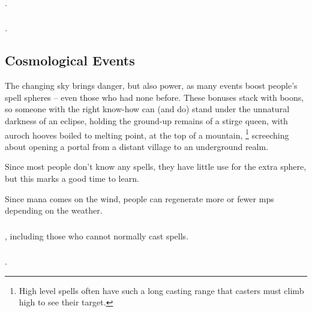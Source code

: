 \begin{multicols}{2}
\subsubsection{}
.

\subsubsection{}
.

\setcounter{track}{\month}
\setcounter{age}{1}
\boxPair[t]{
  \parallelCalendar
}{
  \orrery[1/1, 1/16, 2/1, 3/1, 2/16, 12/16]
}

\setCycle{\month}{\day}

\subsection{Cosmological Events}
\label{weather}

The changing sky brings danger, but also power, as many events boost people's spell \glspl{sphere} -- even those who had none before.
These bonuses stack with \glspl{boon}, so someone with the right know-how can (and do) stand under the unnatural darkness of an eclipse, holding the ground-up remains of a stirge queen, with auroch hooves boiled to melting point, at the top of a mountain,%
\footnote{High level spells often have such a long casting range that casters must climb high to see their target.}
screeching about opening a portal from a distant \gls{village} to an underground realm.

Since most people don't know any spells, they have little use for the extra \gls{sphere}, but this marks a good time to learn.

Since mana comes on the wind, people can regenerate more or fewer \glspl{mp} depending on the weather.

\toggletrue{genExamples}
\weatherChart

\subsubsection{}
, including those who cannot normally cast spells.

\subsubsection{}
.


\end{multicols}
